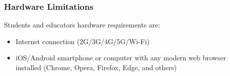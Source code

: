 \subsubsection{Hardware Limitations}
Students and educators hardware requirements are:
\begin{itemize}
    \item Internet connection (2G/3G/4G/5G/Wi-Fi)
    \item iOS/Android smartphone or computer with any modern web browser installed (Chrome, Opera, Firefox, Edge, and others)
\end{itemize}
